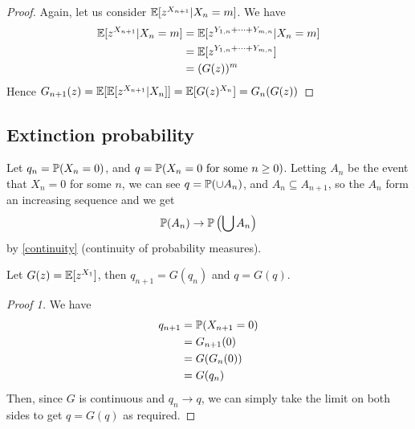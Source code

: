 \documentclass{../../template/note}
\begin{document}
    \begin{proof}
        Again, let us consider \(\mathbb E[z^{X_{n+1}} | X_n = m]\). We have
        \begin{align*}
            \mathbb E[z^{X_{n+1}} | X_n = m] &= \mathbb E[z^{Y_{1, n} + \dots + Y_{m, n}} | X_n = m] \\
            &= \mathbb E[z^{Y_{1, n} + \dots + Y_{m, n}}] \\
            &= (G(z))^m
        \end{align*}
        Hence \(G_{n+1}(z) = \mathbb E[\mathbb E[z^{X_{n+1}} | X_n]] = \mathbb E[G(z)^{X_n}] = G_n(G(z))\)
    \end{proof}
    
    \subsection{Extinction probability}

    Let \(q_n = \mathbb P(X_n = 0)\), and \(q = \mathbb P(X_n = 0 \text{ for some }n \geq 0)\). Letting \(A_n\) be the event that \(X_n = 0\) for some \(n\), we can see \(q = \mathbb P(\cup A_n)\), and \(A_n \subseteq A_{n+1}\), so the \(A_n\) form an increasing sequence and we get
    \begin{align*}
        \mathbb P(A_n) \to \mathbb P\left(\bigcup A_n\right)
    \end{align*}
    by \cref{continuity} (continuity of probability measures).
    
    \begin{lemma}
        Let \(G(z) = \mathbb E[z^{X_1}]\), then \(q_{n+1} = G(q_n)\) and \(q = G(q)\).
    \end{lemma}
    
    \begin{proof}[Proof 1]
        We have
        \begin{align*}
            q_{n+1} &= \mathbb P(X_{n+1} = 0) \\
            &= G_{n+1}(0) \\
            &= G(G_n(0)) \\
            &= G(q_n)
        \end{align*}
        Then, since \(G\) is continuous and \(q_n \to q\), we can simply take the limit on both sides to get \(q=G(q)\) as required.
    \end{proof}
    
\end{document}
